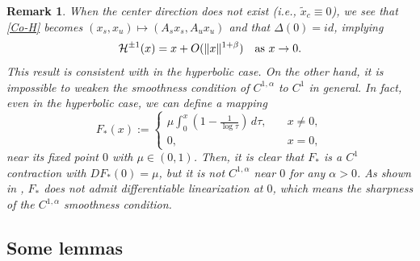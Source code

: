 \documentclass[reqno]{amsart}
\numberwithin{equation}{section}
\newtheorem{remark}[theorem]{Remark}
\begin{document}
\begin{remark}
{\rm When the center direction does not exist (i.e., $\tilde{x}_c\equiv 0$), we see that \eqref{Co-H} becomes $(x_s,x_u)\mapsto (A_sx_s,A_ux_u)$ and that $\Delta(0)=id$, implying
$$
\mathcal{H}^{\pm 1}(x)=x+O(\|x\|^{1+\beta})\quad {\rm as}~x\to 0.
$$
This result is consistent with \cite[Theorem 7.1]{ZLZ-TAMS} in the hyperbolic case.
On the other hand, it is impossible to weaken the smoothness condition of $C^{1,\alpha}$ to $C^1$ in general.
In fact, even in the hyperbolic case, we can define a mapping
$$
F_{*}(x):=
\begin{cases}
\mu \int_0^x (1-\frac{1}{\log \tau}) \, d\tau, \quad &x\ne 0,
\\
0, &x=0,
\end{cases}
$$
near its fixed point $0$ with $\mu \in (0,1)$. Then, it is clear that  $F_{*}$ is a $C^1$ contraction with $DF_{*}(0)=\mu$, but it is not $C^{1,\alpha}$ near $0$ for any $\alpha>0$. As shown in \cite[p.4998-4999]{ZLZ-TAMS}, $F_{*}$
does not admit differentiable linearization at $0$, which means the sharpness of the $C^{1,\alpha}$ smoothness condition.
}
\end{remark}









\subsection{Some lemmas}\label{sec-sm}
\end{document}
